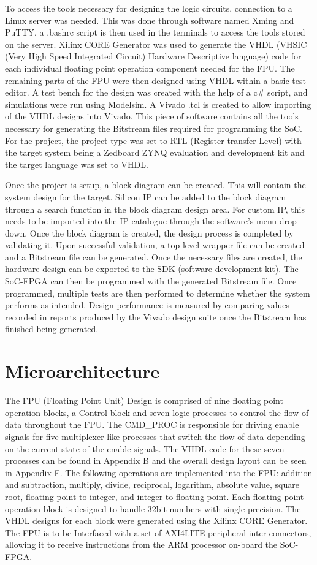 \documentclass[conference]{IEEEtran}
\begin{document}
To access the tools necessary for designing the logic circuits, connection to a Linux server was needed. This was done through software named Xming and PuTTY. a .bashrc script is then used in the terminals to access the tools stored on the server. Xilinx CORE Generator was used to generate the VHDL (VHSIC (Very High Speed Integrated Circuit) Hardware Descriptive language) code for each individual floating point operation component needed for the FPU. The remaining parts of the FPU were then designed using VHDL within a basic test editor. A test bench for the design was created with the help of a c\# script, and simulations were run using Modelsim. A Vivado .tcl is created to allow importing of the VHDL designs into Vivado. This piece of software contains all the tools necessary for generating the Bitstream files required for programming the SoC.  For the project, the project type was set to RTL (Register transfer Level) with the target system being a Zedboard ZYNQ evaluation and development kit and the target language was set to VHDL.
\newline

Once the project is setup, a block diagram can be created. This will contain the system design for the target. Silicon IP can be added to the block diagram through a search function in the block diagram design area. For custom IP, this needs to be imported into the IP catalogue through the software’s menu drop-down. Once the block diagram is created, the design process is completed by validating it. Upon successful validation, a top level wrapper file can be created and a Bitstream file can be generated. Once the necessary files are created, the hardware design can be exported to the SDK (software development kit). The SoC-FPGA can then be programmed with the generated Bitstream file.  Once programmed, multiple tests are then performed to determine whether the system performs as intended. Design performance is measured by comparing values recorded in reports produced by the Vivado design suite once the Bitstream has finished being generated.
\section{Microarchitecture}

The FPU (Floating Point Unit) Design is comprised of nine floating point operation blocks, a Control block and seven logic processes to control the flow of data throughout the FPU. The CMD\_PROC is responsible for driving enable signals for five multiplexer-like processes that switch the flow of data depending on the current state of the enable signals. The VHDL code for these seven processes can be found in Appendix B and the overall design layout can be seen in Appendix F. The following operations are implemented into the FPU: addition and subtraction, multiply, divide, reciprocal, logarithm, absolute value, square root, floating point to integer, and integer to floating point. Each floating point operation block is designed to handle 32bit numbers with single precision. The VHDL designs for each block were generated using the Xilinx CORE Generator. The FPU is to be Interfaced with a set of AXI4LITE peripheral inter connectors, allowing it to receive instructions from the ARM processor on-board the SoC-FPGA. 
\end{document}
